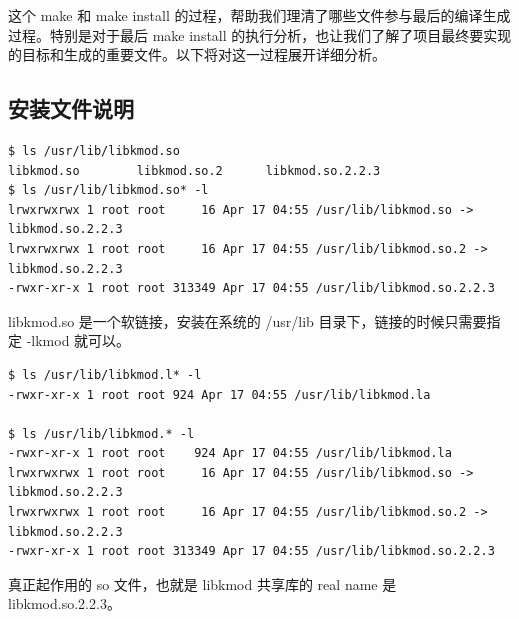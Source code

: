 这个 make 和 make install
的过程，帮助我们理清了哪些文件参与最后的编译生成过程。特别是对于最后 make
install
的执行分析，也让我们了解了项目最终要实现的目标和生成的重要文件。以下将对这一过程展开详细分析。

\subsection{安装文件说明}

{\begin{shaded}\begin{verbatim}
$ ls /usr/lib/libkmod.so
libkmod.so        libkmod.so.2      libkmod.so.2.2.3  
$ ls /usr/lib/libkmod.so* -l
lrwxrwxrwx 1 root root     16 Apr 17 04:55 /usr/lib/libkmod.so -> libkmod.so.2.2.3
lrwxrwxrwx 1 root root     16 Apr 17 04:55 /usr/lib/libkmod.so.2 -> libkmod.so.2.2.3
-rwxr-xr-x 1 root root 313349 Apr 17 04:55 /usr/lib/libkmod.so.2.2.3
\end{verbatim}\end{shaded}}
libkmod.so 是一个软链接，安装在系统的 /usr/lib
目录下，链接的时候只需要指定 -lkmod 就可以。

{\begin{shaded}\begin{verbatim}
$ ls /usr/lib/libkmod.l* -l
-rwxr-xr-x 1 root root 924 Apr 17 04:55 /usr/lib/libkmod.la

$ ls /usr/lib/libkmod.* -l
-rwxr-xr-x 1 root root    924 Apr 17 04:55 /usr/lib/libkmod.la
lrwxrwxrwx 1 root root     16 Apr 17 04:55 /usr/lib/libkmod.so -> libkmod.so.2.2.3
lrwxrwxrwx 1 root root     16 Apr 17 04:55 /usr/lib/libkmod.so.2 -> libkmod.so.2.2.3
-rwxr-xr-x 1 root root 313349 Apr 17 04:55 /usr/lib/libkmod.so.2.2.3
\end{verbatim}\end{shaded}}
真正起作用的 so 文件，也就是 libkmod 共享库的 real name 是
libkmod.so.2.2.3。

